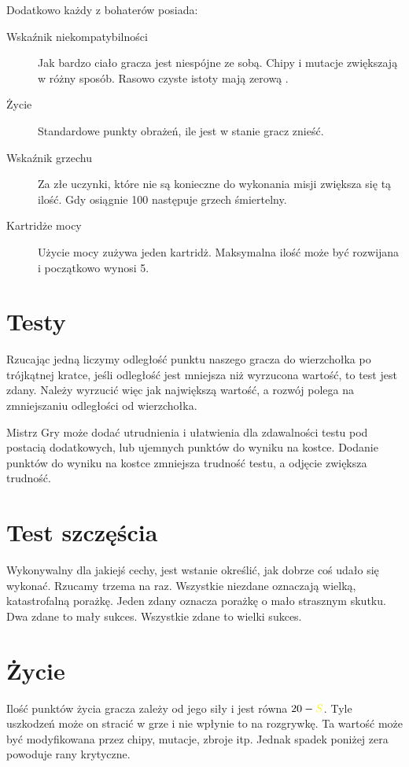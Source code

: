 Dodatkowo każdy z bohaterów posiada:
\begin{description}
 \item [Wskaźnik niekompatybilności \abnkp{}] Jak bardzo ciało gracza jest niespójne ze sobą. Chipy i mutacje zwiększają \abnkp{} w różny sposób. Rasowo czyste istoty mają zerową \abnkp{}.
 \item [Życie \abzyc{}] Standardowe punkty obrażeń, ile jest w stanie gracz znieść.
 \item [Wskaźnik grzechu \abgrz{}] Za złe uczynki, które nie są konieczne do wykonania misji zwiększa się tą ilość. Gdy osiągnie 100 następuje grzech śmiertelny.
 \item [Kartridże mocy \abkar{}] Użycie mocy zużywa jeden kartridż. Maksymalna ilość może być rozwijana i początkowo wynosi 5.
\end{description}

\section{Testy}
Rzucając jedną \dxx{} liczymy odległość punktu naszego gracza do wierzchołka po trójkątnej kratce, jeśli odległość jest mniejsza niż wyrzucona wartość, to test jest zdany.
Należy wyrzucić więc jak największą wartość, a rozwój polega na zmniejszaniu odległości od wierzchołka.

Mistrz Gry może dodać utrudnienia i ułatwienia dla zdawalności testu pod postacią dodatkowych, lub ujemnych punktów do wyniku na kostce.
Dodanie punktów do wyniku na kostce zmniejsza trudność testu, a odjęcie zwiększa trudność.

\section{Test szczęścia}
Wykonywalny dla jakiejś cechy, jest wstanie określić, jak dobrze coś udało się wykonać.
Rzucamy trzema \dxx{} na raz. 
Wszystkie niezdane oznaczają wielką, katastrofalną porażkę.
Jeden zdany oznacza porażkę o mało strasznym skutku.
Dwa zdane to mały sukces.
Wszystkie zdane to wielki sukces.

\section{Życie}
Ilość punktów życia gracza zależy od jego siły i jest równa $20 - \abs$.
Tyle uszkodzeń może on stracić w grze i nie wpłynie to na rozgrywkę.
Ta wartość może być modyfikowana przez chipy, mutacje, zbroje itp.
Jednak spadek poniżej zera powoduje rany krytyczne.

